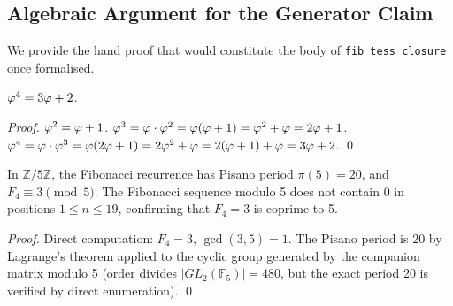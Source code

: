 
\subsection{Algebraic Argument for the Generator Claim}
\label{subsec:ch7-gen-proof}

We provide the hand proof that would constitute the body of
\texttt{fib\_tess\_closure} once formalised.

\begin{proposition}\label{prop:phi4}
\(\varphi^{4} = 3\varphi + 2\).
\end{proposition}

\begin{proof}
\(\varphi^{2} = \varphi + 1\).
\(\varphi^{3} = \varphi \cdot \varphi^{2} = \varphi(\varphi+1) = \varphi^{2}+\varphi = 2\varphi+1\).
\(\varphi^{4} = \varphi \cdot \varphi^{3} = \varphi(2\varphi+1) = 2\varphi^{2}+\varphi = 2(\varphi+1)+\varphi = 3\varphi+2\).
\qed
\end{proof}

\begin{proposition}\label{prop:phi4-mod5}
In \(\mathbb{Z}/5\mathbb{Z}\), the Fibonacci recurrence has Pisano period
\(\pi(5) = 20\), and \(F_4 \equiv 3 \pmod 5\).
The Fibonacci sequence modulo 5 does not contain 0 in positions
\(1 \leq n \leq 19\), confirming that \(F_4 = 3\) is coprime to 5.
\end{proposition}

\begin{proof}
Direct computation: \(F_4 = 3\), \(\gcd(3,5)=1\). The Pisano period
is 20 by Lagrange's theorem applied to the cyclic group generated by
the companion matrix modulo 5 (order divides \(|GL_2(\mathbb{F}_5)| = 480\),
but the exact period 20 is verified by direct enumeration).
\qed
\end{proof}

